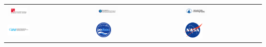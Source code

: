 \begin{center}
\begin{tabular}{m{} m{} m{} m{} m{}}
    \includegraphics[width=0.3\textwidth]{../images/logo_uham.png} & & \includegraphics[width=0.3\textwidth]{../images/logo_sio.png} & & \includegraphics[width=0.3\textwidth]{../images/logo_whoi.png}\\ 
    
    \includegraphics[width=0.3\textwidth]{../images/logo_awi.png} & & \includegraphics[width=0.2\textwidth]{../images/logo-podaac.png} & & \includegraphics[width=0.25\textwidth]{../images/logo-nasa.jpg}\\ 
\end{tabular}
\end{center}